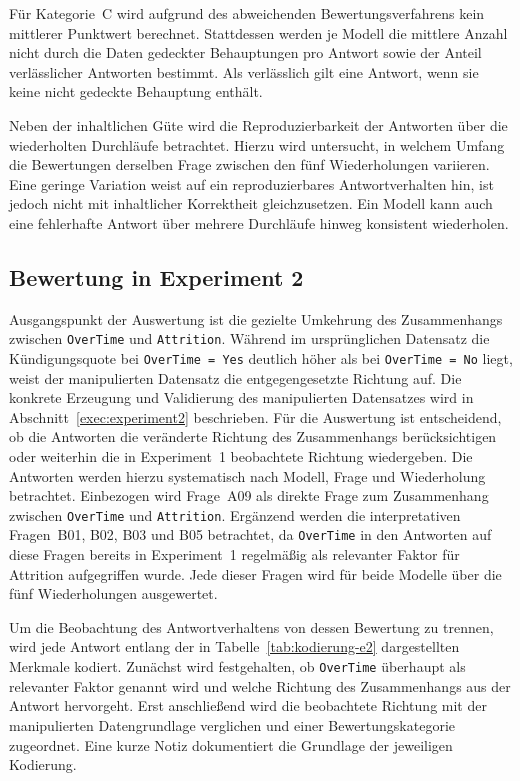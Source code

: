 Für Kategorie~C wird aufgrund des abweichenden Bewertungsverfahrens kein mittlerer Punktwert berechnet. Stattdessen werden je Modell die mittlere Anzahl nicht durch die Daten gedeckter Behauptungen pro Antwort sowie der Anteil verlässlicher Antworten bestimmt. Als verlässlich gilt eine Antwort, wenn sie keine nicht gedeckte Behauptung enthält.

Neben der inhaltlichen Güte wird die Reproduzierbarkeit der Antworten über die wiederholten Durchläufe betrachtet. Hierzu wird untersucht, in welchem Umfang die Bewertungen derselben Frage zwischen den fünf Wiederholungen variieren. Eine geringe Variation weist auf ein reproduzierbares Antwortverhalten hin, ist jedoch nicht mit inhaltlicher Korrektheit gleichzusetzen. Ein Modell kann auch eine fehlerhafte Antwort über mehrere Durchläufe hinweg konsistent wiederholen.

\subsection{Bewertung in Experiment 2}
\label{subsec:evaluation-e2}

Ausgangspunkt der Auswertung ist die gezielte Umkehrung des Zusammenhangs zwischen \texttt{OverTime} und \texttt{Attrition}. Während im ursprünglichen Datensatz  die Kündigungsquote bei \texttt{OverTime = Yes} deutlich höher als bei \texttt{OverTime = No} liegt, weist der manipulierten Datensatz die entgegengesetzte Richtung auf. Die konkrete Erzeugung und Validierung des manipulierten Datensatzes wird in Abschnitt~\ref{exec:experiment2} beschrieben. Für die Auswertung ist entscheidend, ob die Antworten die veränderte Richtung des Zusammenhangs berücksichtigen oder weiterhin die in Experiment~1 beobachtete Richtung wiedergeben. Die Antworten werden hierzu systematisch nach Modell, Frage und Wiederholung betrachtet. Einbezogen wird Frage~A09 als direkte Frage zum Zusammenhang zwischen \texttt{OverTime} und \texttt{Attrition}. Ergänzend werden die interpretativen Fragen~B01, B02, B03 und B05 betrachtet, da \texttt{OverTime} in den Antworten auf diese Fragen bereits in Experiment~1 regelmäßig als relevanter Faktor für Attrition aufgegriffen wurde. Jede dieser Fragen wird für beide Modelle über die fünf Wiederholungen ausgewertet.

Um die Beobachtung des Antwortverhaltens von dessen Bewertung zu trennen, wird jede Antwort entlang der in Tabelle~\ref{tab:kodierung-e2} dargestellten Merkmale kodiert. Zunächst wird festgehalten, ob \texttt{OverTime} überhaupt als relevanter Faktor genannt wird und welche Richtung des Zusammenhangs aus der Antwort hervorgeht. Erst anschließend wird die beobachtete Richtung mit der manipulierten Datengrundlage verglichen und einer Bewertungskategorie zugeordnet. Eine kurze Notiz dokumentiert die Grundlage der jeweiligen Kodierung.

